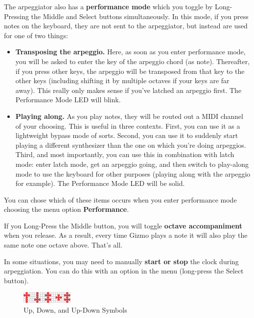 \documentclass{article}
\begin{document}
The arpeggiator also has a {\bf performance mode} which you toggle by Long-Pressing the Middle and Select buttons simultaneously.  In this mode, if you press notes on the keyboard, they are not sent to the arpeggiator, but instead are used for one of two things:
	\begin{itemize}
	\item {\bf Transposing the arpeggio.}  Here, as soon as you enter performance mode, you will be asked to enter the key of the arpeggio chord (as note).  Thereafter, if you press other keys, the arpeggio will be transposed from that key to the other keys (including shifting it by multiple octaves if your keys are far away).  This really only makes sense if you've latched an arpeggio first.  The Performance Mode LED will blink.
	\item {\bf Playing along.}  As you play notes, they will be routed out a MIDI channel of your choosing.  This is useful in three contexts.  First, you can use it as a lightweight bypass mode of sorts.  Second, you can use it to suddenly start playing a different synthesizer than the one on which you're doing arpeggios.   Third, and most importantly, you can use this in combination with latch mode: enter latch mode, get an arpeggio going, and then switch to play-along mode to use the keyboard for other purposes (playing along with the arpeggio for example).  The Performance Mode LED will be solid.
	\end{itemize}
You can chose which of these items occurs when you enter performance mode choosing the menu option {\bf Performance}.

If you Long-Press the Middle button, you will toggle {\bf octave accompaniment} when you release.  As a result, every time Gizmo plays a note it will also play the same note one octave above.  That's all.

In some situations, you may need to manually {\bf start or stop} the clock during arpeggiation.  You can do this with an option in the menu (long-press the Select button).

\begin{figure}
\begin{center}
\vspace{-1em}
\includegraphics[width=1in]{updown}
\vspace{-1em}
\caption{\small Up, Down, and Up-Down Symbols}
\vspace{-3em}
\end{center}
\end{figure}
\end{document}
